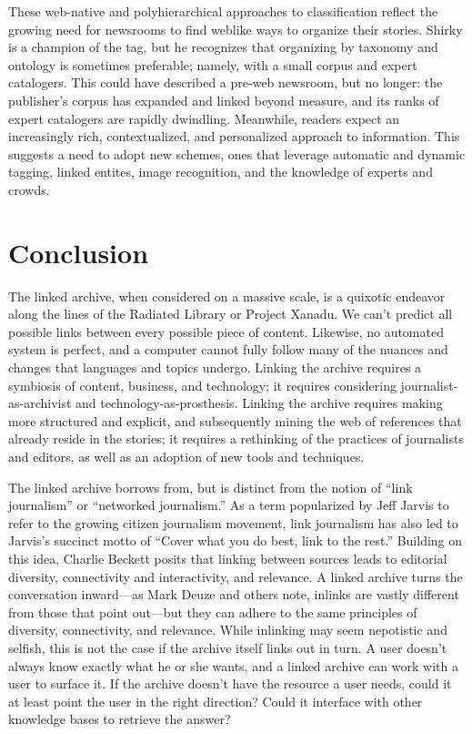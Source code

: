 These web-native and polyhierarchical approaches to classification reflect the growing need for newsrooms to find weblike ways to organize their stories. Shirky is a champion of the tag, but he recognizes that organizing by taxonomy and ontology is sometimes preferable; namely, with a small corpus and expert catalogers.\autocite{shirky_ontology_2005} This could have described a pre-web newsroom, but no longer: the publisher's corpus has expanded and linked beyond measure, and its ranks of expert catalogers are rapidly dwindling. Meanwhile, readers expect an increasingly rich, contextualized, and personalized approach to information. This suggests a need to adopt new schemes, ones that leverage automatic and dynamic tagging, linked entites, image recognition, and the knowledge of experts and crowds.

\section{Conclusion}

The linked archive, when considered on a massive scale, is a quixotic endeavor along the lines of the Radiated Library or Project Xanadu. We can't predict all possible links between every possible piece of content. Likewise, no automated system is perfect, and a computer cannot fully follow many of the nuances and changes that languages and topics undergo. Linking the archive requires a symbiosis of content, business, and technology; it requires considering journalist-as-archivist and technology-as-prosthesis. Linking the archive requires making more structured and explicit, and subsequently mining the web of references that already reside in the stories; it requires a rethinking of the practices of journalists and editors, as well as an adoption of new tools and techniques.

The linked archive borrows from, but is distinct from the notion of ``link journalism'' or ``networked journalism.'' As a term popularized by Jeff Jarvis to refer to the growing citizen journalism movement, link journalism has also led to Jarvis's succinct motto of ``Cover what you do best, link to the rest.''\autocites{jarvis_new_2007}{jarvis_networked_2006} Building on this idea, Charlie Beckett posits that linking between sources leads to editorial diversity, connectivity and interactivity, and relevance.\autocite{beckett_editorial_2010} A linked archive turns the conversation inward---as Mark Deuze and others note, inlinks are vastly different from those that point out---but they can adhere to the same principles of diversity, connectivity, and relevance. While inlinking may seem nepotistic and selfish, this is not the case if the archive itself links out in turn.  A user doesn't always know exactly what he or she wants, and a linked archive can work with a user to surface it. If the archive doesn't have the resource a user needs, could it at least point the user in the right direction? Could it interface with other knowledge bases to retrieve the answer?


